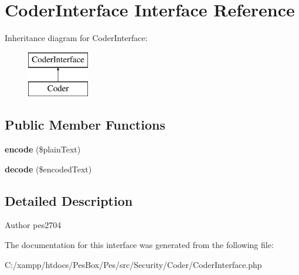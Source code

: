 \hypertarget{interface_pes_1_1_security_1_1_coder_1_1_coder_interface}{}\section{Coder\+Interface Interface Reference}
\label{interface_pes_1_1_security_1_1_coder_1_1_coder_interface}
Inheritance diagram for Coder\+Interface\+:\begin{figure}[H]
\begin{center}
\leavevmode
\includegraphics[height=2.000000cm]{interface_pes_1_1_security_1_1_coder_1_1_coder_interface}
\end{center}
\end{figure}
\subsection*{Public Member Functions}
\begin{DoxyCompactItemize}
\item 
\mbox{\label{interface_pes_1_1_security_1_1_coder_1_1_coder_interface_a16f142f25f95700f25e05ae0f3b45377}} 
{\bfseries encode} (\$plain\+Text)
\item 
\mbox{\label{interface_pes_1_1_security_1_1_coder_1_1_coder_interface_aa4be2a14b7ecb0e18e4fde52012f9a47}} 
{\bfseries decode} (\$encoded\+Text)
\end{DoxyCompactItemize}


\subsection{Detailed Description}
\begin{DoxyAuthor}{Author}
pes2704 
\end{DoxyAuthor}


The documentation for this interface was generated from the following file\+:\begin{DoxyCompactItemize}
\item 
C\+:/xampp/htdocs/\+Pes\+Box/\+Pes/src/\+Security/\+Coder/Coder\+Interface.\+php\end{DoxyCompactItemize}
